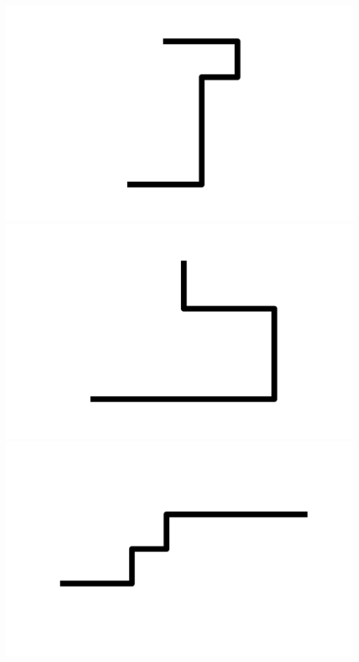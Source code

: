 \documentclass[]{report}
\begin{document}
\includegraphics[scale=.1]{pictures/21/state_cluster_shapes_19.pdf} 
\includegraphics[scale=.1]{pictures/21/state_cluster_shapes_20.pdf} 
\includegraphics[scale=.1]{pictures/21/state_cluster_shapes_21.pdf} 
\end{document}

